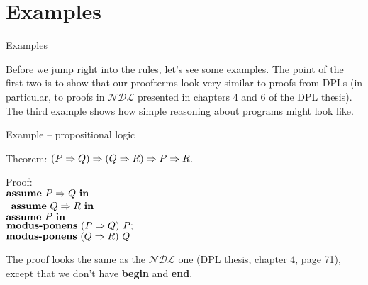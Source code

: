 \documentclass{beamer}
\newcommand{\NDL}{\mathcal{NDL}}
\begin{document}
\section{Examples}

\begin{frame}{Examples}

Before we jump right into the rules, let's see some examples. The point of the first two is to show that our proofterms look very similar to proofs from DPLs (in particular, to proofs in $\NDL$ presented in chapters 4 and 6 of the DPL thesis). The third example shows how simple reasoning about programs might look like.

\end{frame}

\begin{frame}{Example -- propositional logic}

Theorem: $(P \Rightarrow Q) \Rightarrow (Q \Rightarrow R) \Rightarrow P \Rightarrow R$.

\vspace{2em}

Proof: \\
$\textbf{assume}\ P \Rightarrow Q\ \textbf{in}\ $ \\
\, $\textbf{assume}\ Q \Rightarrow R\ \textbf{in}\ $ \\
\quad $\textbf{assume}\ P\ \textbf{in}\ $ \\
\qquad $\textbf{modus-ponens}\ (P \Rightarrow Q)\ P;$ \\
\qquad $\textbf{modus-ponens}\ (Q \Rightarrow R)\ Q$

\vspace{2em}

The proof looks the same as the $\NDL$ one (DPL thesis, chapter 4, page 71), except that we don't have \textbf{begin} and \textbf{end}.

\end{frame}
\end{document}
